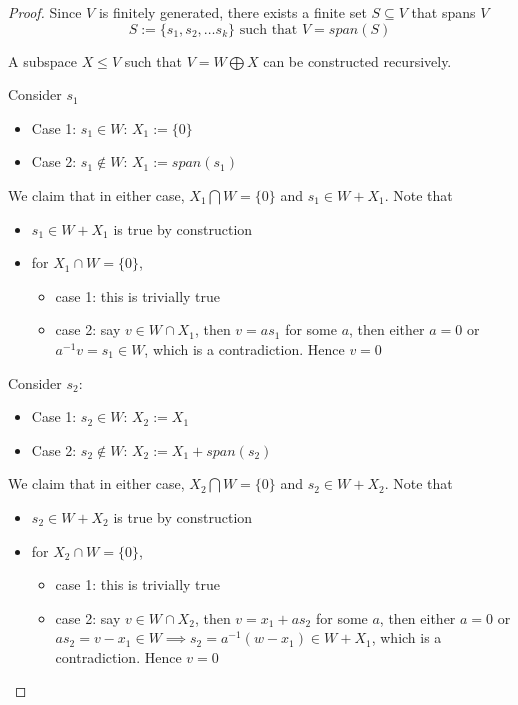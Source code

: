 \begin{proof}
Since $V$ is finitely generated, there exists a finite set $S \subseteq V$ that spans $V$
\[
  S := \{ s_1, s_2, \hdots s_k \} \text{ such that }V= span(S)
\]

A subspace $X \leq V$ such that $V = W \bigoplus X$ can be constructed recursively. 

Consider $s_1$
\begin{itemize}
    \item Case 1: $s_1 \in W$: $X_1 := \{ 0 \} $
    \item Case 2: $s_1 \notin W$: $X_1 := span(s_1)$
\end{itemize} 

We claim that in either case, $X_1 \bigcap W = \{ 0 \} $ and $s_1 \in W + X_1$. Note that 
\begin{itemize}
    \item $s_1 \in W + X_1$ is true by construction 
    \item for $X_1 \cap W = \{ 0 \} $,
    \begin{itemize}
        \item case 1: this is trivially true
        \item case 2: say $v \in W \cap X_1$, then $v = as_1$ for some $a$, then either $a = 0$ or $a^{-1} v = s_1 \in W$, which is a contradiction. Hence $v = 0$
    \end{itemize} 
\end{itemize} 

Consider $s_2$:
\begin{itemize}
    \item Case 1: $s_2 \in W$: $X_2 := X_1 $
    \item Case 2: $s_2 \notin W$: $X_2 := X_1 + span(s_2)$
\end{itemize} 

We claim that in either case, $X_2 \bigcap W = \{ 0 \} $ and $s_2 \in W + X_2$. Note that 
\begin{itemize}
    \item $s_2 \in W + X_2$ is true by construction 
    \item for $X_2 \cap W = \{ 0 \} $,
    \begin{itemize}
        \item case 1: this is trivially true
        \item case 2: say $v \in W \cap X_2$, then $v = x_1 + as_2$ for some $a$, then either $a = 0$ or $as_2 = v - x_1 \in W \implies s_2 = a^{-1}(w - x_1) \in W + X_1$, which is a contradiction. Hence $v = 0$
    \end{itemize} 
\end{itemize} 


\end{proof}
